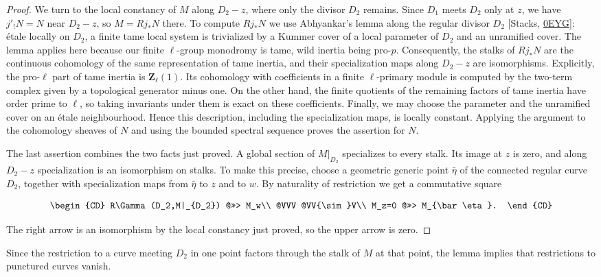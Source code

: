 \documentclass[11pt]{article}
\begin{document}
\begin{proof}[{Proof}]
We turn to the local constancy of \(M\) along \(D_2-z\), where only the divisor \(D_2\) remains. Since \(D_1\) meets \(D_2\) only at \(z\), we have \(j'_!N=N\) near \(D_2-z\), so \(M=Rj_*N\) there. To compute \(Rj_*N\) we use Abhyankar's lemma along the regular divisor \(D_2\) [Stacks, \href{https://stacks.math.columbia.edu/tag/0EYG}{0EYG}]: étale locally on \(D_2\), a finite tame local system is trivialized by a Kummer cover of a local parameter of \(D_2\) and an unramified cover. The lemma applies here because our finite \(\ell\)-group monodromy is tame, wild inertia being pro-\(p\). Consequently, the stalks of \(Rj_*N\) are the continuous cohomology of the same representation of tame inertia, and their specialization maps along \(D_2-z\) are isomorphisms. Explicitly, the pro-\(\ell\) part of tame inertia is \(\mathbf Z_\ell(1)\). Its cohomology with coefficients in a finite \(\ell\)-primary module is computed by the two-term complex given by a topological generator minus one. On the other hand, the finite quotients of the remaining factors of tame inertia have order prime to \(\ell\), so taking invariants under them is exact on these coefficients. Finally, we may choose the parameter and the unramified cover on an étale neighbourhood. Hence this description, including the specialization maps, is locally constant. Applying the argument to the cohomology sheaves of \(N\) and using the bounded spectral sequence proves the assertion for \(N\).

The last assertion combines the two facts just proved. A global section of \(M|_{D_2}\) specializes to every stalk. Its image at \(z\) is zero, and along \(D_2-z\) specialization is an isomorphism on stalks. To make this precise, choose a geometric generic point \(\bar\eta\) of the connected regular curve \(D_2\), together with specialization maps from \(\bar\eta\) to \(z\) and to \(w\). By naturality of restriction we get a commutative square

\[
\begin{CD}
R\Gamma(D_2,M|_{D_2}) @>>> M_w\\
@VVV @VV{\sim}V\\
M_z=0 @>>> M_{\bar\eta}.
\end{CD}
\]

The right arrow is an isomorphism by the local constancy just proved, so the upper arrow is zero.
\end{proof}

\label{bp255}%
Since the restriction to a curve meeting \(D_2\) in one point factors through the stalk of \(M\) at that point, the lemma implies that restrictions to punctured curves vanish.
\end{document}

